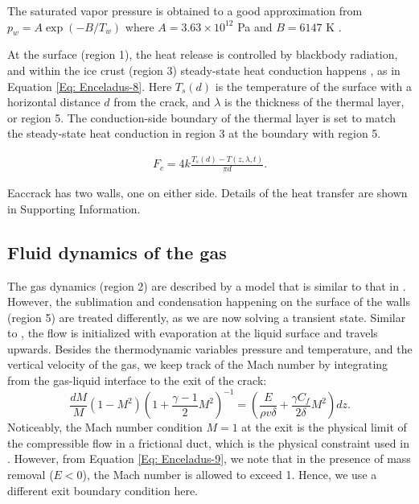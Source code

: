 \documentclass[draft]{agujournal2019}
\begin{document}
\begin{refsection}
The saturated vapor pressure is obtained to a good approximation from $p_w=A\exp\left(-B/T_w\right)$ where $A=3.63\times 10^{12}$ Pa and $B=6147$ K \cite{nakajima2016controlled}.

At the surface (region 1), the heat release is controlled by blackbody radiation, and within the ice crust (region 3) steady-state heat conduction happens \cite{ingersoll2010subsurface}, as in Equation
\ref{Eq: Enceladus-8}. Here $T_s(d)$ is the temperature of the surface with a horizontal distance $d$ from the crack, and $\lambda$ is the thickness of the thermal layer, or region 5. The conduction-side boundary of the thermal layer is set to match the steady-state heat conduction in region 3 at the boundary with region 5.

\begin{eqnarray}
    F_c = 4k \frac{T_s(d) - T(z,\lambda,t)}{\pi d}.
\label{Eq: Enceladus-8}
\end{eqnarray}

Eaccrack has two walls, one on either side. Details of the heat transfer are shown in Supporting Information.

\subsection{Fluid dynamics of the gas}
The gas dynamics (region 2) are described by a model that is similar to that in . However, the sublimation and condensation happening on the surface of the walls (region 5) are treated differently, as we are now solving a transient state. Similar to , the flow is initialized with evaporation at the liquid surface and travels upwards. Besides the thermodynamic variables pressure and temperature, and the vertical velocity of the gas, we keep track of the Mach number by integrating from the gas-liquid interface to the exit of the crack:
\begin{equation}
    \frac{dM}{M} (1 - M^2) \left( 1 + \frac{\gamma - 1}{2} M^2 \right)^{-1} = \left( \frac{E}{\rho v \delta} + \frac{\gamma C_f}{2\delta} M^2 \right) dz
    \label{Eq: Enceladus-9}.
\end{equation}
Noticeably, the Mach number condition $M=1$ at the exit is the physical limit of the compressible flow in a frictional duct, which is the physical constraint used in . However, from Equation \ref{Eq: Enceladus-9}, we note that in the presence of mass removal ($E<0$), the Mach number is allowed to exceed 1. Hence, we use a different exit boundary condition here.


\end{refsection}
\end{document}

